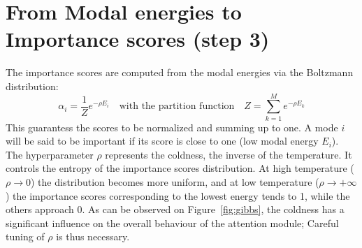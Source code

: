 
\section{From Modal energies to Importance scores (step 3)}
The importance scores are computed from the modal energies via the Boltzmann distribution:
\begin{equation}
\alpha_i = \frac{1}{Z}e^{-\rho E_i} \quad \text{with the partition function} \quad Z = \sum_{k=1}^M e^{-\rho E_k} 
\label{eq:gibbs-distrib}
\end{equation}
This guarantess the scores to be normalized and summing up to one. A mode $i$ will be said to be important if its score is close to one (low modal energy $E_i$). The hyperparameter $\rho$ represents the coldness, the inverse of the temperature. It controls the entropy of the importance scores distribution. At high temperature ($\rho \rightarrow 0$) the distribution becomes more uniform, and at low temperature ($\rho \rightarrow +\infty$) the importance scores corresponding to the lowest energy tends to 1, while the others approach 0. As can be observed on Figure \,\ref{fig:gibbs}, the coldness has a significant influence on the overall behaviour of the attention module; Careful tuning of $\rho$ is thus necessary.

